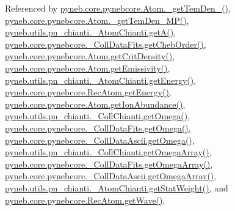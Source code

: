Referenced by \hyperlink{pynebcore_8py_source_l01869}{pyneb.\-core.\-pynebcore.\-Atom.\-\_\-get\-Tem\-Den\-\_()}, \hyperlink{pynebcore_8py_source_l02046}{pyneb.\-core.\-pynebcore.\-Atom.\-\_\-get\-Tem\-Den\-\_\-\-M\-P()}, \hyperlink{pn__chianti_8py_source_l00316}{pyneb.\-utils.\-pn\-\_\-chianti.\-\_\-\-Atom\-Chianti.\-get\-A()}, \hyperlink{pynebcore_8py_source_l00711}{pyneb.\-core.\-pynebcore.\-\_\-\-Coll\-Data\-Fits.\-get\-Cheb\-Order()}, \hyperlink{pynebcore_8py_source_l01759}{pyneb.\-core.\-pynebcore.\-Atom.\-get\-Crit\-Density()}, \hyperlink{pynebcore_8py_source_l01782}{pyneb.\-core.\-pynebcore.\-Atom.\-get\-Emissivity()}, \hyperlink{pn__chianti_8py_source_l00366}{pyneb.\-utils.\-pn\-\_\-chianti.\-\_\-\-Atom\-Chianti.\-get\-Energy()}, \hyperlink{pynebcore_8py_source_l02927}{pyneb.\-core.\-pynebcore.\-Rec\-Atom.\-get\-Energy()}, \hyperlink{pynebcore_8py_source_l02176}{pyneb.\-core.\-pynebcore.\-Atom.\-get\-Ion\-Abundance()}, \hyperlink{pn__chianti_8py_source_l00507}{pyneb.\-utils.\-pn\-\_\-chianti.\-\_\-\-Coll\-Chianti.\-get\-Omega()}, \hyperlink{pynebcore_8py_source_l00828}{pyneb.\-core.\-pynebcore.\-\_\-\-Coll\-Data\-Fits.\-get\-Omega()}, \hyperlink{pynebcore_8py_source_l01082}{pyneb.\-core.\-pynebcore.\-\_\-\-Coll\-Data\-Ascii.\-get\-Omega()}, \hyperlink{pn__chianti_8py_source_l00484}{pyneb.\-utils.\-pn\-\_\-chianti.\-\_\-\-Coll\-Chianti.\-get\-Omega\-Array()}, \hyperlink{pynebcore_8py_source_l00800}{pyneb.\-core.\-pynebcore.\-\_\-\-Coll\-Data\-Fits.\-get\-Omega\-Array()}, \hyperlink{pynebcore_8py_source_l01058}{pyneb.\-core.\-pynebcore.\-\_\-\-Coll\-Data\-Ascii.\-get\-Omega\-Array()}, \hyperlink{pn__chianti_8py_source_l00343}{pyneb.\-utils.\-pn\-\_\-chianti.\-\_\-\-Atom\-Chianti.\-get\-Stat\-Weight()}, and \hyperlink{pynebcore_8py_source_l02699}{pyneb.\-core.\-pynebcore.\-Rec\-Atom.\-get\-Wave()}.


